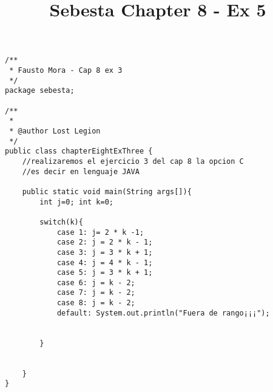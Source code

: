 \documentclass{article}
\begin{document}
\lstset{language=JAva}          %
\title{Sebesta Chapter 8 - Ex 5}
\begin{lstlisting}[frame=single]  % Start your code-block
/**
 * Fausto Mora - Cap 8 ex 3
 */
package sebesta;

/**
 *
 * @author Lost Legion
 */
public class chapterEightExThree {
    //realizaremos el ejercicio 3 del cap 8 la opcion C
    //es decir en lenguaje JAVA
    
    public static void main(String args[]){
        int j=0; int k=0;
        
        switch(k){
            case 1: j= 2 * k -1;
            case 2: j = 2 * k - 1;
            case 3: j = 3 * k + 1;
            case 4: j = 4 * k - 1;
            case 5: j = 3 * k + 1;
            case 6: j = k - 2;
            case 7: j = k - 2;
            case 8: j = k - 2;
            default: System.out.println("Fuera de rango¡¡¡");
                
        
        }
        
    
    }
}
\end{lstlisting}
\end{document}
